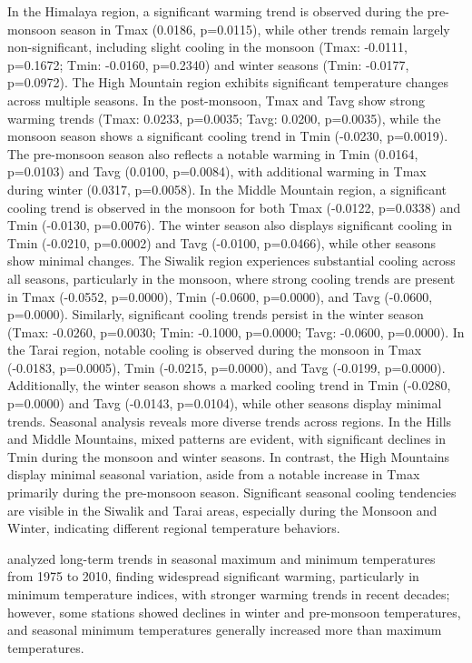 In the Himalaya region, a significant warming trend is observed during the pre-monsoon season in Tmax (0.0186, p=0.0115), while other trends remain largely non-significant, including slight cooling in the monsoon (Tmax: -0.0111, p=0.1672; Tmin: -0.0160, p=0.2340) and winter seasons (Tmin: -0.0177, p=0.0972).
The High Mountain region exhibits significant temperature changes across multiple seasons. In the post-monsoon, Tmax and Tavg show strong warming trends (Tmax: 0.0233, p=0.0035; Tavg: 0.0200, p=0.0035), while the monsoon season shows a significant cooling trend in Tmin (-0.0230, p=0.0019). The pre-monsoon season also reflects a notable warming in Tmin (0.0164, p=0.0103) and Tavg (0.0100, p=0.0084), with additional warming in Tmax during winter (0.0317, p=0.0058).
In the Middle Mountain region, a significant cooling trend is observed in the monsoon for both Tmax (-0.0122, p=0.0338) and Tmin (-0.0130, p=0.0076). The winter season also displays significant cooling in Tmin (-0.0210, p=0.0002) and Tavg (-0.0100, p=0.0466), while other seasons show minimal changes.
The Siwalik region experiences substantial cooling across all seasons, particularly in the monsoon, where strong cooling trends are present in Tmax (-0.0552, p=0.0000), Tmin (-0.0600, p=0.0000), and Tavg (-0.0600, p=0.0000). Similarly, significant cooling trends persist in the winter season (Tmax: -0.0260, p=0.0030; Tmin: -0.1000, p=0.0000; Tavg: -0.0600, p=0.0000).
In the Tarai region, notable cooling is observed during the monsoon in Tmax (-0.0183, p=0.0005), Tmin (-0.0215, p=0.0000), and Tavg (-0.0199, p=0.0000). Additionally, the winter season shows a marked cooling trend in Tmin (-0.0280, p=0.0000) and Tavg (-0.0143, p=0.0104), while other seasons display minimal trends.
Seasonal analysis reveals more diverse trends across regions. In the Hills and Middle Mountains, mixed patterns are evident, with significant declines in Tmin during the monsoon and winter seasons. In contrast, the High Mountains display minimal seasonal variation, aside from a notable increase in Tmax primarily during the pre-monsoon season. Significant seasonal cooling tendencies are visible in the Siwalik and Tarai areas, especially during the Monsoon and Winter, indicating different regional temperature behaviors. 

\textcite{shrestha_observed_2017} analyzed long-term trends in seasonal maximum and minimum temperatures from 1975 to 2010, finding widespread significant warming, particularly in minimum temperature indices, with stronger warming trends in recent decades; however, some stations showed declines in winter and pre-monsoon temperatures, and seasonal minimum temperatures generally increased more than maximum temperatures.

